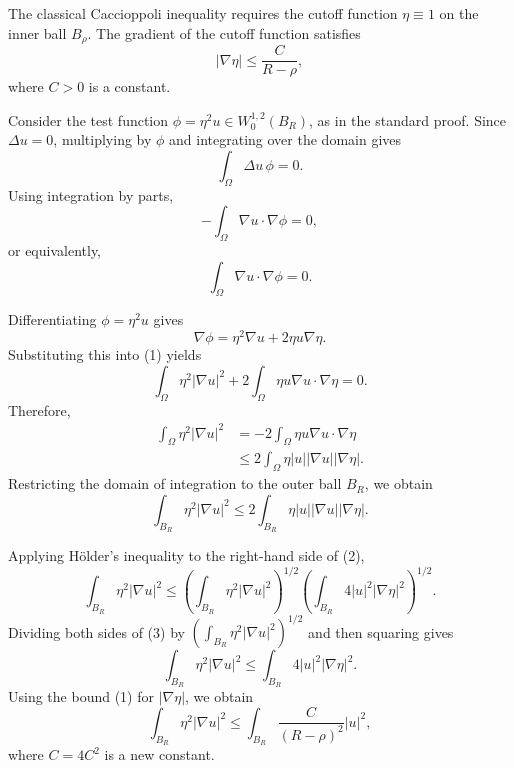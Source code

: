 \begin{answer}
    The classical Caccioppoli inequality requires the cutoff function $\eta \equiv 1$ on the inner ball $B_\rho$. The gradient of the cutoff function satisfies
    \begin{equation}
        |\nabla \eta| \le \frac{C}{R-\rho},
    \end{equation}
    where $C > 0$ is a constant.

    Consider the test function $\phi = \eta^2 u \in W^{1,2}_0(B_R)$, as in the standard proof. Since $\Delta u = 0$, multiplying by $\phi$ and integrating over the domain gives
    \[
    \int_{\Omega} \Delta u \, \phi = 0.
    \]
    Using integration by parts,
    \[
    -\int_\Omega \nabla u \cdot \nabla \phi = 0,
    \]
    or equivalently,
    \begin{equation}
        \int_\Omega \nabla u \cdot \nabla \phi = 0. \tag{1}
    \end{equation}

    Differentiating $\phi = \eta^2 u$ gives
    \[
    \nabla \phi = \eta^2 \nabla u + 2\eta u \nabla \eta.
    \]
    Substituting this into (1) yields
    \[
    \int_\Omega \eta^2 |\nabla u|^2 + 2 \int_\Omega \eta u \nabla u \cdot \nabla \eta = 0.
    \]
    Therefore,
    \begin{align*}
        \int_\Omega \eta^2 |\nabla u|^2 &= -2 \int_\Omega \eta u \nabla u \cdot \nabla \eta \\
        &\le 2 \int_\Omega \eta |u| |\nabla u| |\nabla \eta|.
    \end{align*}
    Restricting the domain of integration to the outer ball $B_R$, we obtain
    \begin{equation}
        \int_{B_R} \eta^2 |\nabla u|^2 \le 2 \int_{B_R} \eta |u| |\nabla u| |\nabla \eta|. \tag{2}
    \end{equation}

    Applying Hölder's inequality to the right-hand side of (2),
    \begin{equation}
        \int_{B_R} \eta^2 |\nabla u|^2
        \le
        \left( \int_{B_R} \eta^2 |\nabla u|^2 \right)^{1/2}
        \left( \int_{B_R} 4 |u|^2 |\nabla \eta|^2 \right)^{1/2}. \tag{3}
    \end{equation}
    Dividing both sides of (3) by $\left( \int_{B_R} \eta^2 |\nabla u|^2 \right)^{1/2}$ and then squaring gives
    \begin{equation}
        \int_{B_R} \eta^2 |\nabla u|^2 \le \int_{B_R} 4 |u|^2 |\nabla \eta|^2. \tag{4}
    \end{equation}
    Using the bound (1) for $|\nabla \eta|$, we obtain
    \begin{equation}
        \int_{B_R} \eta^2 |\nabla u|^2 \le \int_{B_R} \frac{C}{(R-\rho)^2} |u|^2, \tag{5}
    \end{equation}
    where $C = 4C^2$ is a new constant.


\end{answer}
